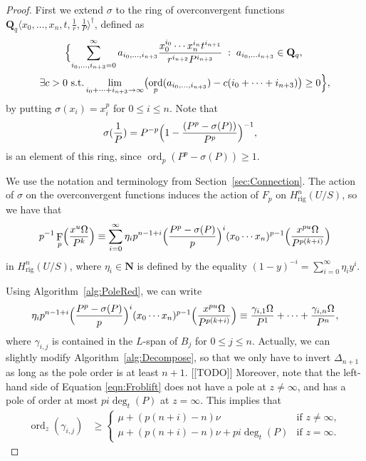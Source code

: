 \documentclass[a4paper,11pt]{article}
\numberwithin{equation}{section}
\newcommand{\NN}{\mathbf{N}} %
\newcommand{\QQ}{\mathbf{Q}} %
\DeclareMathOperator{\ord}{ord}          %
\DeclareMathOperator{\Frob}{F}           %
\providecommand{\Hrig}{H_{\text{rig}}}  %
\theoremstyle{definition}
\begin{document}
\begin{proof}
First we extend $\sigma$ to the ring of overconvergent functions
$\QQ_q \langle x_0, \dotsc, x_n, t, \frac{1}{r}, \frac{1}{P} \rangle^{\dag}$, 
defined as 
\begin{multline*}
\Bigl\{ \sum_{i_0,\dotsc,i_{n+3}=0}^{\infty} a_{i_0, \dotsc, i_{n+3}} 
\frac{x_0^{i_0} \dotsm x_n^{i_{n}}t^{i_{n+1}}}{r^{i_{n+2}} P^{i_{n+3}}} \; : \;
a_{i_0, \dotsc i_{n+3}} \in \QQ_q, \; \\ 
\exists c > 0 \text{ s.t.} \lim_{i_0+\dotsb+i_{n+3} \rightarrow \infty} \bigl(\ord_p(a_{i_0, \dotsc, i_{n+3}} ) - 
c(i_0+\dotsb+i_{n+3})\bigr) \geq 0 \Bigr\},
\end{multline*}
by putting $\sigma(x_i) = x_i^p$ for $0 \leq i \leq n$. Note that
\begin{align*}
\sigma(\frac{1}{P}) &= P^{-p} \Bigl( 1-\frac{(P^p-\sigma(P))}{P^p} \Bigr)^{-1},
\end{align*}
is an element of this ring, since $\ord_p(P^p-\sigma(P)) \geq 1$.

We use the notation and terminology from Section~\ref{sec:Connection}. 
The action of $\sigma$ on the overconvergent functions induces the action of 
$F_p$ on $\Hrig^n(U/S)$, so we have that
\begin{equation*}
p^{-1} \Frob_p \Bigl(\frac{x^u \Omega}{P^{k}} \Bigr) \equiv
\sum_{i=0}^{\infty} \eta_i p^{n-1+i} \Bigl(\frac{P^p-\sigma(P)}{p} \Bigr)^i 
(x_0 \dotsm x_n)^{p-1} \Bigl( \frac{x^{pu} \Omega}{P^{p(k+i)}} \Bigr)
\end{equation*}
in $\Hrig^n(U/S)$, where $\eta_i \in \NN$ is defined by the equality 
$(1-y)^{-i} = \sum_{i=0}^{\infty} \eta_i y^i$. 

Using Algorithm~\ref{alg:PoleRed}, we can write
\begin{equation} \label{eqn:Froblift}
\eta_i p^{n-1+i} \Bigl(\frac{P^p-\sigma(P)}{p} \Bigr)^i 
(x_0 \dotsm x_n)^{p-1} \Bigl( \frac{x^{pu} \Omega}{P^{p(k+i)}} \Bigr) \equiv
\frac{\gamma_{i,1} \Omega}{P^1}+\dotsb+\frac{\gamma_{i,n} \Omega}{P^n},
\end{equation}
where $\gamma_{i,j}$ is contained in the $L$-span of $B_j$ for $0 \leq j \leq n$.
Actually, we can slightly modify Algorithm~\ref{alg:Decompose},  
so that we only have to invert $\Delta_{n+1}$ as long as the pole 
order is at least $n+1$. [[TODO]] Moreover, note that the left-hand side of
Equation \eqref{eqn:Froblift} does not have a pole
at $z \neq \infty$, and has a pole of order at most 
$pi\deg_t(P)$ at $z=\infty$. This implies that
\begin{align*}
\ord_z(\gamma_{i,j}) &\geq 
\begin{cases}
\mu + (p(n+i)-n) \nu                 &\mbox{if } z \neq \infty, \\
\mu + (p(n+i)-n) \nu + pi \deg_t(P)  &\mbox{if } z=\infty.
\end{cases}
\end{align*}


\end{proof}
\end{document}

